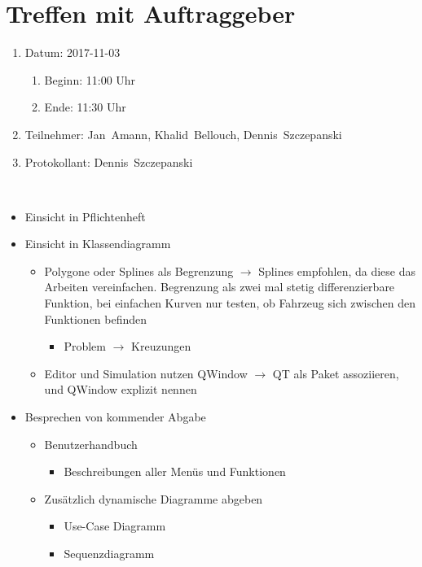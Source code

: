 \pagebreak
\section[Treffen mit Auftraggeber - 2017-11-03]{Treffen mit Auftraggeber}

\begin{enumerate}
	\item Datum: 2017-11-03
	\begin{enumerate}[label*=\arabic*.]
		\item Beginn: 11:00 Uhr
		\item Ende: 11:30 Uhr
	\end{enumerate}
	
	\item Teilnehmer:
	\subitem Jan~Amann, Khalid~Bellouch, Dennis~Szczepanski
	
	\item Protokollant: Dennis~Szczepanski
\end{enumerate}
\ \\

\begin{itemize}
	\item Einsicht in Pflichtenheft 
	\item Einsicht in Klassendiagramm
	\begin{itemize}
		\item Polygone oder Splines als Begrenzung $\rightarrow$ Splines empfohlen, da diese das Arbeiten vereinfachen. Begrenzung als zwei mal stetig differenzierbare Funktion, bei einfachen Kurven nur testen, ob Fahrzeug sich zwischen den Funktionen befinden
		\begin{itemize}
			\item Problem $\rightarrow$ Kreuzungen
		\end{itemize}
		\item Editor und Simulation nutzen QWindow $\rightarrow$ QT als Paket assoziieren, und QWindow explizit nennen
	\end{itemize}
	\item Besprechen von kommender Abgabe
	\begin{itemize}
		\item Benutzerhandbuch
		\begin{itemize}
			\item Beschreibungen aller Menüs und Funktionen
		\end{itemize}
		\item Zusätzlich dynamische Diagramme abgeben
		\begin{itemize}
			\item Use-Case Diagramm
			\item Sequenzdiagramm
		\end{itemize}
	\end{itemize}
\end{itemize}
